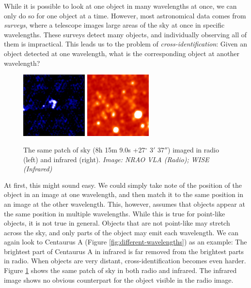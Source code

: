 While it is possible to look at one object in many wavelengths at once, we can
only do so for one object at a time. However, most astronomical data comes from
\emph{surveys}, where a telescope images large areas of the sky at once in
specific wavelengths. These surveys detect many objects, and individually
observing all of them is impractical. This leads us to the problem of
\emph{cross-identification}: Given an object detected at one wavelength, what
is the corresponding object at another wavelength?

\begin{figure}
  \centering
  \includegraphics[width=0.3\textwidth]{images/first_FIRSTJ081509.0+270337.jpg}
  \includegraphics[width=0.3\textwidth]{images/wise_FIRSTJ081509.0+270337.jpg}
  \caption{The same patch of sky (8h 15m 9.0s +27$^\circ$ 3$'$ 37$''$) imaged in
    radio (left) and infrared (right). \emph{Image: NRAO VLA (Radio); WISE
    (Infrared)}}
  \label{fig:radio-ir-comparison}
\end{figure}

At first, this might sound easy. We could simply take note of the position of
the object in an image at one wavelength, and then match it to the same
position in an image at the other wavelength. This, however, assumes that
objects appear at the same position in multiple wavelengths. While this is
true for point-like objects, it is not true in general. Objects that are not
point-like may stretch across the sky, and only parts of the object may emit
each wavelength. We can again look to Centaurus A (Figure
\ref{fig:different-wavelengths}) as an example: The brightest part of
Centaurus A in infrared is far removed from the brightest parts in radio. When
objects are very distant, cross-identification becomes even harder. Figure
\ref{fig:radio-ir-comparison} shows the same patch of sky in both radio and
infrared. The infrared image shows no obvious counterpart for the object
visible in the radio image.

